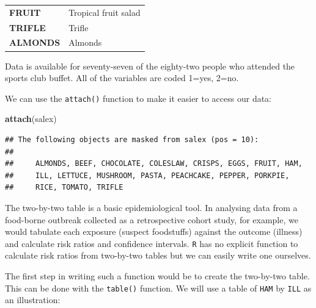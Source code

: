 \documentclass[12pt,]{book}
\newenvironment{Shaded}{\begin{snugshade}}{\end{snugshade}}
\newcommand{\KeywordTok}[1]{\textcolor[rgb]{0.13,0.29,0.53}{\textbf{#1}}}
\newcommand{\NormalTok}[1]{#1}
\theoremstyle{definition}
\theoremstyle{definition}
\theoremstyle{definition}
\theoremstyle{remark}
\begin{document}
\begin{longtable}[]{@{}ll@{}}
\begin{minipage}[t]{0.21\columnwidth}\raggedright
\textbf{FRUIT}\strut
\end{minipage} & \begin{minipage}[t]{0.30\columnwidth}\raggedright
Tropical fruit salad\strut
\end{minipage}\tabularnewline
\begin{minipage}[t]{0.21\columnwidth}\raggedright
\textbf{TRIFLE}\strut
\end{minipage} & \begin{minipage}[t]{0.30\columnwidth}\raggedright
Trifle\strut
\end{minipage}\tabularnewline
\begin{minipage}[t]{0.21\columnwidth}\raggedright
\textbf{ALMONDS}\strut
\end{minipage} & \begin{minipage}[t]{0.30\columnwidth}\raggedright
Almonds\strut
\end{minipage}\tabularnewline
\bottomrule
\end{longtable}

Data is available for seventy-seven of the eighty-two people who
attended the sports club buffet. All of the variables are coded 1=yes,
2=no.

We can use the \texttt{attach()} function to make it easier to access
our data:

\begin{Shaded}
\begin{Highlighting}[]
\KeywordTok{attach}\NormalTok{(salex)}
\end{Highlighting}
\end{Shaded}

\begin{verbatim}
## The following objects are masked from salex (pos = 10):
## 
##     ALMONDS, BEEF, CHOCOLATE, COLESLAW, CRISPS, EGGS, FRUIT, HAM,
##     ILL, LETTUCE, MUSHROOM, PASTA, PEACHCAKE, PEPPER, PORKPIE,
##     RICE, TOMATO, TRIFLE
\end{verbatim}

The two-by-two table is a basic epidemiological tool. In analysing data
from a food-borne outbreak collected as a retrospective cohort study,
for example, we would tabulate each exposure (suspect foodstuffs)
against the outcome (illness) and calculate risk ratios and confidence
intervals. \texttt{R} has no explicit function to calculate risk ratios
from two-by-two tables but we can easily write one ourselves.

The first step in writing such a function would be to create the
two-by-two table. This can be done with the \texttt{table()} function.
We will use a table of \texttt{HAM} by \texttt{ILL} as an illustration:
\end{document}
